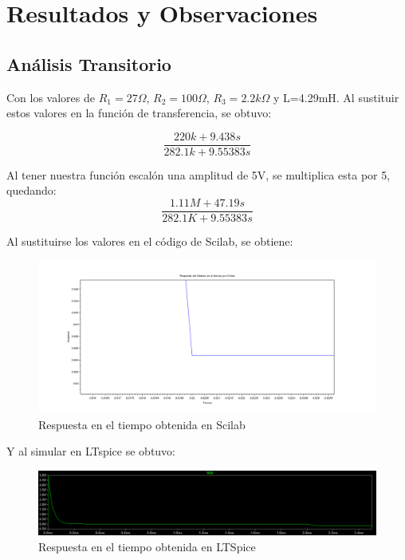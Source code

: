 \documentclass{article}
\begin{document}
	 \section{Resultados y Observaciones}
	 
	 \subsection{Análisis Transitorio}
	 Con los valores de $ R_1=27\Omega $, $ R_2=100\Omega $, $ R_3=2.2k\Omega $ y L=4.29mH. Al sustituir estos valores en la función de transferencia, se obtuvo:
	 
	 \begin{equation}
	 \frac{220k+9.438s}{282.1k+9.55383s}
	 \end{equation}
	 

Al tener nuestra función escalón una amplitud de 5V, se multiplica esta por 5, quedando:
\begin{equation}
\frac{1.11M+47.19s}{282.1K+9.55383s}
\end{equation}

Al sustituirse los valores en el código de Scilab, se obtiene:

\begin{figure}[H]
	\centering
	\includegraphics[scale=0.2]{trs.png}
	\centering
	\caption{Respuesta en el tiempo obtenida en Scilab}
	\label{trs}
\end{figure}

Y al simular en LTspice se obtuvo:

\begin{figure}[H]
	\centering
	\includegraphics[width=0.7\linewidth]{trlt}
	\caption{Respuesta en el tiempo obtenida en LTSpice}
	\label{fig:trlt}
\end{figure}
\end{document}
